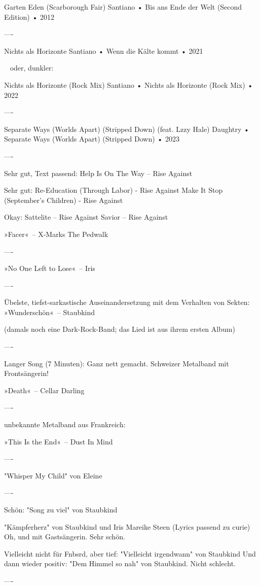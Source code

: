 Garten Eden (Scarborough Fair)
Santiano
 •
Bis ans Ende der Welt (Second Edition)
 •
2012

----

Nichts als Horizonte
Santiano
 •
Wenn die Kälte kommt
 •
2021

~ oder, dunkler: ~

Nichts als Horizonte (Rock Mix)
Santiano
 •
Nichts als Horizonte (Rock Mix)
 • 2022

----

Separate Ways (Worlds Apart) (Stripped Down) (feat. Lzzy Hale)
Daughtry
 •
Separate Ways (Worlds Apart) (Stripped Down)
 •
2023

----

Sehr gut, Text passend:
Help Is On The Way – Rise Against

Sehr gut:
Re-Education (Through Labor) - Rise Against
Make It Stop (September's Children) - Rise Against

Okay:
Sattelite – Rise Against
Savior – Rise Against

»Facer«~– X-Marks The Pedwalk

----

»No One Left to Lose«~– Iris

----

Übelste, tiefst-sarkastische Auseinandersetzung mit dem Verhalten von Sekten:
»Wunderschön«~– Staubkind

(damals noch eine Dark-Rock-Band; das Lied ist aus ihrem ersten Album)

----

Langer Song (7 Minuten): Ganz nett gemacht. Schweizer Metalband mit Frontsängerin!

»Death«~– Cellar Darling

----

unbekannte Metalband aus Frankreich:

»This Is the End«~– Dust In Mind

----

"Whisper My Child" von Eleine

----

Schön:
"Song zu viel" von Staubkind

"Kämpferherz" von Staubkind und Iris Mareike Steen
 (Lyrics passend zu curie)
Oh, und mit Gastsängerin. Sehr schön.

Vielleicht nicht für Fnbsrd, aber tief:
"Vielleicht irgendwann" von Staubkind
Und dann wieder positiv:
"Dem Himmel so nah" von Staubkind. Nicht schlecht.

----


